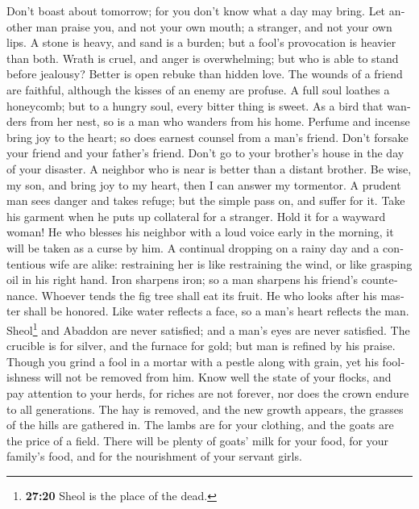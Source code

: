 \begin{paracol}{2}
\begin{otherlanguage}{english}
 Don't boast about tomorrow; for you don't know what a day
may bring.  Let another man praise you, and not your own
mouth; a stranger, and not your own lips.  A stone is
heavy, and sand is a burden; but a fool's provocation is heavier than
both.  Wrath is cruel, and anger is overwhelming; but who
is able to stand before jealousy?  Better is open rebuke
than hidden love.  The wounds of a friend are faithful,
although the kisses of an enemy are profuse.  A full soul
loathes a honeycomb; but to a hungry soul, every bitter thing is sweet.
 As a bird that wanders from her nest, so is a man who
wanders from his home.  Perfume and incense bring joy to
the heart; so does earnest counsel from a man's friend. 
Don't forsake your friend and your father's friend. Don't go to your
brother's house in the day of your disaster. A neighbor who is near is
better than a distant brother.  Be wise, my son, and
bring joy to my heart, then I can answer my tormentor.  A
prudent man sees danger and takes refuge; but the simple pass on, and
suffer for it.  Take his garment when he puts up
collateral for a stranger. Hold it for a wayward woman! 
He who blesses his neighbor with a loud voice early in the morning, it
will be taken as a curse by him.  A continual dropping on
a rainy day and a contentious wife are alike: 
restraining her is like restraining the wind, or like grasping oil in
his right hand.  Iron sharpens iron; so a man sharpens
his friend's countenance.  Whoever tends the fig tree
shall eat its fruit. He who looks after his master shall be honored.
 Like water reflects a face, so a man's heart reflects
the man.  Sheol\footnote{\textbf{27:20} Sheol is the
  place of the dead.} and Abaddon are never satisfied; and a man's eyes
are never satisfied.  The crucible is for silver, and the
furnace for gold; but man is refined by his praise. 
Though you grind a fool in a mortar with a pestle along with grain, yet
his foolishness will not be removed from him.  Know well
the state of your flocks, and pay attention to your herds,
 for riches are not forever, nor does the crown endure to
all generations.  The hay is removed, and the new growth
appears, the grasses of the hills are gathered in.  The
lambs are for your clothing, and the goats are the price of a field.
 There will be plenty of goats' milk for your food, for
your family's food, and for the nourishment of your servant girls.


\end{otherlanguage}
\end{paracol}
